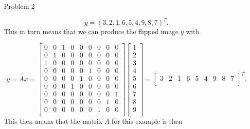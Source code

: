 \begin{problem}{Problem 2}
\begin{Highlight}
        \setcounter{equation}{0}
        \begin{equation}
            y = (3,2,1,6,5,4,9,8,7)^{T}.
        \end{equation}
        This in turn means that we can produce the flipped image $y$ with

        \begin{equation}
            y = Ax = 
            \begin{bmatrix}
                0 & 0 & 1 & 0 & 0 & 0 & 0 & 0 & 0 \\
                0 & 1 & 0 & 0 & 0 & 0 & 0 & 0 & 0 \\
                1 & 0 & 0 & 0 & 0 & 0 & 0 & 0 & 0 \\
                0 & 0 & 0 & 0 & 0 & 1 & 0 & 0 & 0 \\
                0 & 0 & 0 & 0 & 1 & 0 & 0 & 0 & 0 \\
                0 & 0 & 0 & 1 & 0 & 0 & 0 & 0 & 0 \\
                0 & 0 & 0 & 0 & 0 & 0 & 0 & 0 & 1 \\
                0 & 0 & 0 & 0 & 0 & 0 & 0 & 1 & 0 \\
                0 & 0 & 0 & 0 & 0 & 0 & 1 & 0 & 0 \\
            \end{bmatrix}
            \begin{bmatrix}
                1 \\
                2 \\
                3 \\
                4 \\
                5 \\
                6 \\
                7 \\
                8 \\
                9 \\
            \end{bmatrix}
            = 
            \begin{bmatrix}
                3 & 2 & 1 & 6 & 5 & 4 & 9 & 8 & 7 \\
            \end{bmatrix}^{T}.
        \end{equation}
        This then means that the matrix $A$ for this example is then


\end{Highlight}
\end{problem}
